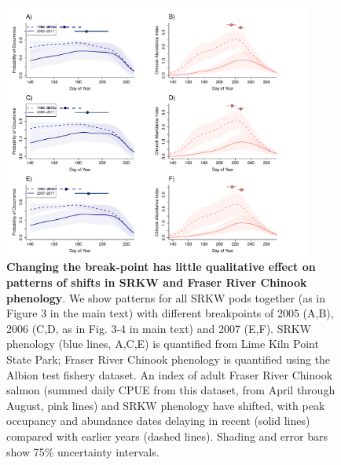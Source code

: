 \documentclass{article}
\begin{document}
\newpage
\begin{figure}[!hp]
\includegraphics[width=0.9\textwidth]{../analyses/orcaphen/figures/orcachinphenoverlapbrmsSRallbrkyears.pdf}
\caption{\textbf{Changing the break-point has little qualitative effect on patterns of shifts in SRKW and Fraser River Chinook phenology}. We show patterns for all SRKW pods together (as in Figure 3 in the main text) with different breakpoints of 2005 (A,B), 2006 (C,D, as in Fig. 3-4 in main text) and 2007 (E,F). SRKW phenology (blue lines, A,C,E) is quantified from Lime Kiln Point State Park; Fraser River Chinook phenology is quantified using the Albion test fishery dataset. An index of adult Fraser River Chinook salmon (summed daily CPUE from this dataset, from April through August, pink lines) and SRKW phenology have shifted, with peak occupancy and abundance dates delaying in recent (solid lines) compared with earlier years (dashed lines). Shading and error bars show 75\% uncertainty intervals.}
\label{fig:brkpt}
\end{figure}
\end{document}
